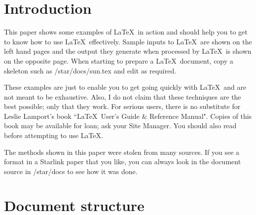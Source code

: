 \documentclass[twoside,11pt]{starlink}
\begin{document}
\scfrontmatter


\section{Introduction}

This paper shows some examples of \LaTeX\ in action and should help you to
get to know how to use \LaTeX\ effectively.
Sample inputs to \LaTeX\ are shown on the left hand pages and the output they
generate when processed by \LaTeX\ is shown on the opposite page.
When starting to prepare a \LaTeX\ document, copy a skeleton such as
/star/docs/sun.tex and edit as required.

These examples are just to enable you to get going quickly with \LaTeX\
and are not meant to be exhaustive.
Also, I do not claim that these techniques are the best possible; only that
they work.
For serious users, there is no substitute for Leslie Lamport's book
``\LaTeX\ User's Guide \& Reference Manual".
Copies of this book may be available for loan; ask your Site Manager.
You should also read \xref{SUN/9}{sun9}{} before attempting to use \LaTeX.

The methods shown in this paper were stolen from many sources.
If you see a format in a Starlink paper that you like, you can always look
in the document source in /star/docs to see how it was done.

\newpage

\section {Document structure}
\end{document}
